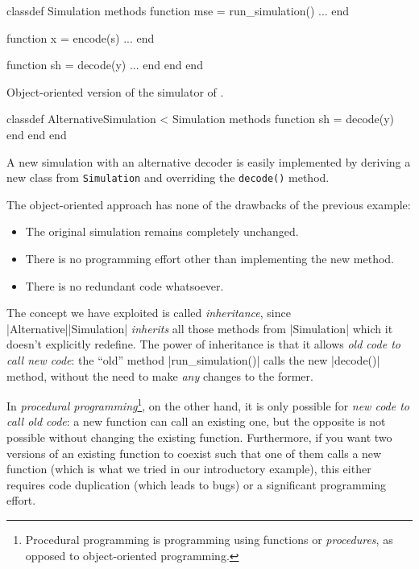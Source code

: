 \begin{listing}
\begin{Code}
  classdef Simulation
    methods
      function mse = run_simulation()
        ... %
      end

      function x = encode(s)
        ...
      end

      function sh = decode(y)
        ...
      end
    end
  end
\end{Code}
  \caption{Object-oriented version of the simulator of .}
  \label{lst:objectsim}
\end{listing}

\begin{listing}
\begin{Code}
  classdef AlternativeSimulation < Simulation
    methods
      function sh = decode(y)
      end
    end 
  end
\end{Code}
  \caption{A new simulation with an alternative decoder is easily implemented by
  deriving a new class from \texttt{Simulation} and overriding the
  \texttt{decode()} method.}
  \label{lst:derivedclass}
\end{listing}

The object-oriented approach has none of the drawbacks of the previous example:
\begin{itemize}
  \item The original simulation remains completely unchanged.
  \item There is no programming effort other than implementing the new method.
  \item There is no redundant code whatsoever.
\end{itemize}

The concept we have exploited is called \emph{inheritance}, since
|Alternative|\-|Simulation| \emph{inherits} all those methods from
|Simulation| which it doesn't explicitly redefine.  The power of
inheritance is that it allows \emph{old code to call new code}: the
``old'' method |run_simulation()| calls the new |decode()| method, without
the need to make \emph{any} changes to the former. 

In \emph{procedural programming}\footnote{Procedural programming is programming
using functions or \emph{procedures}, as opposed to object-oriented
programming.}, on the other hand, it is only possible for \emph{new code to call old code}: a new
function can call an existing one, but the opposite is not possible without
changing the existing function.  Furthermore, if you want two versions of an
existing function to coexist such that one of them calls a new function (which
is what we tried in our introductory example), this either requires code
duplication (which leads to bugs) or a significant programming effort. 


